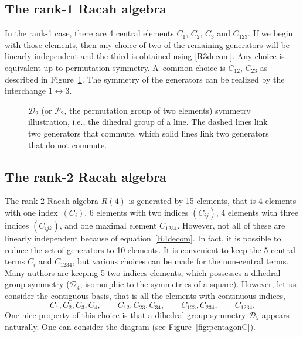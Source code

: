 \documentclass[10pt,a4paper]{amsart}
\numberwithin{equation}{section}
\begin{document}
\subsection{The rank-1 Racah algebra}
In the rank-1 case, there are 4 central elements $C_1$, $C_2$, $C_3$ and $C_{123}$. If we begin with those elements, then any choice of two of the remaining generators will be linearly independent and the third is obtained using \eqref{R3decom}. Any choice is equivalent up to permutation symmetry. A~common choice is $C_{12}$, $C_{23}$ as described in Figure~\ref{fig:pentagonC-1}. The symmetry of the generators can be realized by the interchange $1\longleftrightarrow 3$.


\begin{figure}[t]
\centering
{}
\caption{$\mathcal{D}_2$ (or $\mathcal{P}_2$, the permutation group of two elements) symmetry illustration, i.e., the dihedral group of a line. The dashed lines link two generators that commute, which solid lines link two generators that do not commute.}
\label{fig:pentagonC-1}
\end{figure}


\subsection{The rank-2 Racah algebra}
The rank-2 Racah algebra $R(4)$ is generated by 15 elements, that is 4 elements with one index~$(C_i)$, 6 elements with two indices $(C_{ij})$, 4 elements with three indices $(C_{ijk})$, and one maximal element $C_{1234}$. However, not all of these are linearly independent because of equation~\eqref{R4decom}. In fact, it is possible to reduce the set of generators to 10 elements. It is convenient to keep the 5 central terms $C_i$ and $C_{1234}$, but various choices can be made for the non-central terms. Many authors are keeping 5 two-indices elements, which possesses a dihedral-group symmetry ($\mathcal{D}_4$, isomorphic to the symmetries of a square). However, let us consider the contiguous basis, that is all the elements with continuous indices,
\[
C_1,C_2,C_3,C_4,\qquad C_{12},C_{23},C_{34},\qquad C_{123},C_{234},\qquad C_{1234}.
\]
One nice property of this choice is that a dihedral group symmetry $\mathcal{D}_5$ appears naturally. One can consider the diagram (see Figure~\ref{fig:pentagonC}).
\end{document}
